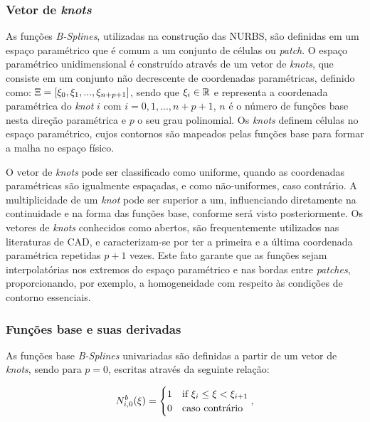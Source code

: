 \documentclass[tese_patricia]{subfiles}
\begin{document}
\subsubsection{Vetor de \textit{knots}}

As funções \textit{B-Splines}, utilizadas na construção das NURBS, são definidas em um espaço paramétrico que é comum a um conjunto de células ou \textit{patch}. O espaço paramétrico unidimensional é construído através de um vetor de \textit{knots}, que consiste em um conjunto não decrescente de coordenadas paramétricas, definido como: $\Xi=\left[\xi_{0},\xi_{1},...,\xi_{n+p+1}\right]$,  sendo que $\xi_{i}\in \mathbb{R}$ e representa a coordenada paramétrica do \textit{knot} $i$ com $i = 0, 1, ..., n+p+1$, $n$ é o número de funções base nesta direção paramétrica e $p$ o seu grau polinomial. Os \textit{knots} definem células no espaço paramétrico, cujos contornos são mapeados pelas funções base para formar a malha no espaço físico. 

O vetor de \textit{knots} pode ser classificado como uniforme, quando as coordenadas paramétricas são igualmente espaçadas, e como não-uniformes, caso contrário.
A multiplicidade de um \textit{knot} pode ser superior a um, influenciando diretamente na continuidade e na forma das funções base, conforme será visto posteriormente.  Os vetores de \textit{knots} conhecidos como abertos, são frequentemente utilizados nas literaturas de CAD, e caracterizam-se por ter a primeira e a última coordenada paramétrica repetidas $p+1$ vezes. Este fato garante que as funções sejam interpolatórias nos extremos do espaço paramétrico e nas bordas entre \textit{patches}, proporcionando, por exemplo, a homogeneidade com respeito às condições de contorno essenciais. 

\subsubsection{Funções base e suas derivadas}

As funções base \textit{B-Splines} univariadas são definidas a partir de um vetor de \textit{knots}, sendo para $p=0$, escritas através da seguinte relação:

\begin{align}
N^b_{i,0}(\xi) = \begin{cases} 1 &\mbox{if } \xi_i\leq\xi<\xi_{i+1} \\
0 & \mbox{caso contrário } \end{cases}, \label{eq:bsplines_0}
\end{align}
\end{document}
